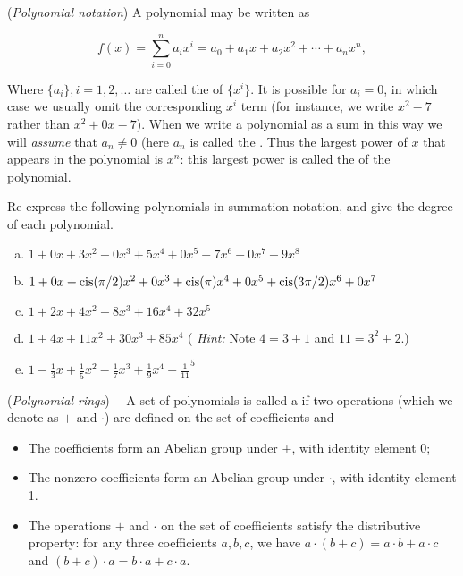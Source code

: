 \begin{defn} (\emph{Polynomial notation}) A polynomial may be written as

\[f(x) = \sum^{n}_{i=0} a_i x^i = a_0 + a_1 x +a_2 x^2 + \cdots + a_n x^n, \]

Where $\{ a_i \}, i=1,2,\ldots$ are called the   of $\{x^i\}$. It is possible for $a_i = 0$, in which case we usually omit the corresponding $x^i$ term (for instance, we write $x^2 -7$ rather than $x^2 + 0x -7$). When we write a polynomial as a sum in this way we will \emph{assume} that $a_n \neq 0$ (here $a_n$ is called the .  Thus the largest power of $x$ that appears in the polynomial is $x^n$: this largest power is called the  of the polynomial.
\end{defn}
\begin{exercise}
Re-express the following polynomials in summation notation,  and give the degree of each polynomial.
\begin{enumerate}[(a)]
\item
$1 + 0x + 3x^2 + 0x^3 + 5x^4 + 0x^5 + 7x^6 +0x^7 +  9x^8$
\item
$1 + 0x + \operatorname{cis}(\pi/2)x^2 + 0x^3 + \operatorname{cis}(\pi)x^4 + 0x^5  + \operatorname{cis}(3\pi/2)x^6 + 0x^7$
\item
$1+ 2x + 4x^2 + 8x^3 + 16x^4 + 32x^5$
\item
$1+4x+11x^2+30x^3+85x^4$ ( \emph{Hint:} Note $4=3+1$ and $11=3^2+2$.)
\item
$1-\frac{1}{3}x + \frac{1}{5}x^2 - \frac{1}{7}x^3 + \frac{1}{9}x^4 - \frac{1}{11}^5$
\end{enumerate}
\end{exercise}



\begin{defn} \label{def:polyring}(\emph{Polynomial rings})~~
A set of polynomials is called a  if two operations (which we denote as $+$ and $\cdot$)  are defined on the set of coefficients and
\begin{itemize}
\item
The coefficients form an Abelian group under +, with identity element 0;
\item
The nonzero coefficients form an Abelian group under $\cdot$, with identity element 1.
\item The operations $+$ and $\cdot$ on the set of coefficients satisfy the distributive property: for any three coefficients $a,b,c$, we have $a \cdot (b + c) = a \cdot b + a \cdot c$ and 
$(b + c) \cdot a = b \cdot a + c \cdot a$.
\end{itemize}
\end{defn}

